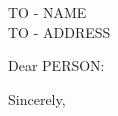\documentclass{letter}
\begin{document}
\begin{letter}{ TO - NAME \\ TO - ADDRESS }
\opening{Dear PERSON:}

\closing{Sincerely,}


\end{letter}
\end{document}
